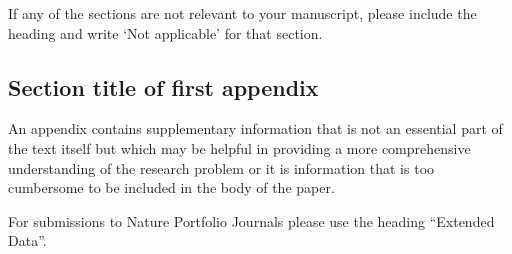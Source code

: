 \documentclass[sn-apa,pdflatex]{sn-jnl}
\theoremstyle{remark}
\theoremstyle{definition}
\begin{document}
\noindent If any of the sections are not relevant to your manuscript,
please include the heading and write `Not applicable' for that section.

\begin{appendices}

\hypertarget{secA1}{%
\section{Section title of first appendix}\label{secA1}}

An appendix contains supplementary information that is not an essential
part of the text itself but which may be helpful in providing a more
comprehensive understanding of the research problem or it is information
that is too cumbersome to be included in the body of the paper.

For submissions to Nature Portfolio Journals please use the heading
``Extended Data''.

\end{appendices}


\end{document}
